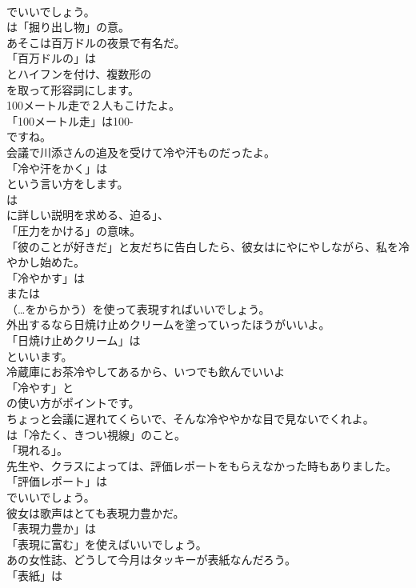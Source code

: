 \documentclass[8pt]{extreport}
\begin{document}
\begin{CJK}{UTF8}{min}
\\	でいいでしょう。
\\	は「掘り出し物」の意。	
\\	あそこは百万ドルの夜景で有名だ。 
\\	「百万ドルの」は
\\	とハイフンを付け、複数形の
\\	を取って形容詞にします。	
\\	100メートル走で２人もこけたよ。 
\\	「100メートル走」は100-
\\	ですね。	
\\	会議で川添さんの追及を受けて冷や汗ものだったよ。 
\\	「冷や汗をかく」は
\\	という言い方をします。
\\	は
\\	に詳しい説明を求める、迫る」、
\\	「圧力をかける」の意味。	
\\	「彼のことが好きだ」と友だちに告白したら、彼女はにやにやしながら、私を冷やかし始めた。 
\\	「冷やかす」は 
\\	または 
\\	（…をからかう）を使って表現すればいいでしょう。	
\\	外出するなら日焼け止めクリームを塗っていったほうがいいよ。 
\\	「日焼け止めクリーム」は 
\\	といいます。	
\\	冷蔵庫にお茶冷やしてあるから、いつでも飲んでいいよ 
\\	「冷やす」と
\\	の使い方がポイントです。	
\\	ちょっと会議に遅れてくらいで、そんな冷ややかな目で見ないでくれよ。 
\\	は「冷たく、きつい視線」のこと。
\\	「現れる」。	
\\	先生や、クラスによっては、評価レポートをもらえなかった時もありました。 
\\	「評価レポート」は
\\	でいいでしょう。	
\\	彼女は歌声はとても表現力豊かだ。 
\\	「表現力豊か」は
\\	「表現に富む」を使えばいいでしょう。	
\\	あの女性誌、どうして今月はタッキーが表紙なんだろう。 
\\	「表紙」は

\end{CJK}
\end{document}
